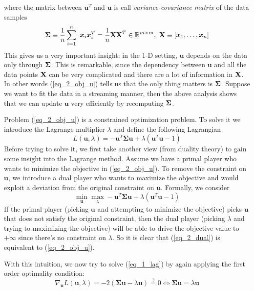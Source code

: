 \documentclass[../book-template.tex]{subfiles}
\begin{document}
where the matrix between $\bm{u}^T$ and $\bm{u}$ is call \emph{variance-covariance matrix} of the data samples
\begin{equation*}
    \bm{\Sigma} \equiv \frac{1}{n}\sum_{i=1}^n\ \bm{x}_i\bm{x}_i^T = \frac{1}{n}{\bf XX}^T \in \mathbb{R}^{m\times m},\ {\bf X}\equiv[\bm{x}_1,\dots,\bm{x}_n]
\end{equation*}
This gives us a very important insight: in the 1-D setting, $\bm{u}$ depends on the data only through ${\bf \Sigma}$. This is remarkable, since the dependency between $\bm{u}$ and all the data points ${\bf X}$ can be very complicated and there are a lot of information in ${\bf X}$. In other words (\ref{eq_2_obj_u}) tells us that the only thing matters is ${\bf \Sigma}$. Suppose we want to fit the data in a streaming manner, then the above analysis shows that we can update $\bm{u}$ very efficiently by recomputing ${\bf \Sigma}$.
\par Problem (\ref{eq_2_obj_u}) is a constrained optimization problem. To solve it we introduce the Lagrange multiplier $\lambda$ and define the following Lagrangian
\begin{equation}\label{eq_1_lag}
    L(\bm{u},\lambda) = -\bm{u}^T\bm{\Sigma u} + \lambda (\bm{u}^T\bm{u}-1)
\end{equation}
Before trying to solve it, we first take another view (from duality theory) to gain some insight into the Lagrange method. Assume we have a primal player who wants to minimize the objective in (\ref{eq_2_obj_u}). To remove the constraint on $\bm{u}$, we introduce a dual player who wants to maximize the objective and would exploit a deviation from the original constraint on $\bm{u}$. Formally, we consider
\begin{equation}\label{eq_2_dual}
    \min_{\bm{u}}\max_{\lambda} -\bm{u}^T\bm{\Sigma u} + \lambda (\bm{u}^T\bm{u}-1)
\end{equation}
If the primal player (picking $\bm{u}$ and attempting to minimize the objective) picks $\bm{u}$ that does not satisfy the original constraint, then the dual player (picking $\lambda$ and trying to maximizing the objective) will be able to drive the objective value to $+\infty$ since there's no constraint on $\lambda$. So it is clear that (\ref{eq_2_dual}) is equivalent to (\ref{eq_2_obj_u}).
\par With this intuition, we now try to solve (\ref{eq_1_lag}) by again applying the first order optimality condition:
\begin{equation*}
    \nabla_{\bm{u}} L(\bm{u},\lambda) = -2(\bm{\Sigma u}-\lambda \bm{u})\overset{!}{=}0 \Longleftrightarrow \bm{\Sigma u}=\lambda \bm{u}
\end{equation*}
\end{document}
